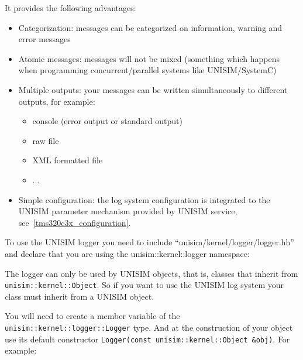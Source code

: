 It provides the following advantages:
\begin{itemize}
\item Categorization: messages can be categorized on information, warning and error messages
\item Atomic messages: messages will not be mixed (something which happens when programming concurrent/parallel systems like UNISIM/SystemC)
\item Multiple outputs: your messages can be written simultaneously to different outputs, for example:
	\begin{itemize}
	\item console (error output or standard output)
	\item raw file
	\item XML formatted file
	\item ...
	\end{itemize}
\item Simple configuration: the log system configuration is integrated to the UNISIM parameter mechanism provided by UNISIM service, see~\ref{tms320c3x_configuration}.
\end{itemize}

To use the UNISIM logger you need to include “unisim/kernel/logger/logger.hh” and declare that you are using the unisim::kernel::logger namespace:

\begin{center}
	
\end{center}

The logger can only be used by UNISIM objects, that is, classes that inherit from \newline
\texttt{unisim::kernel::Object}. 
So if you want to use the UNISIM log system your class must inherit from a UNISIM object.

\begin{center}
	
\end{center}

You will need to create a member variable of the \texttt{unisim::kernel::logger::Logger} type. 
And at the construction of your object use its default constructor \newline
\texttt{Logger(const unisim::kernel::Object \&obj)}. For example:

\begin{center}
	
\end{center}

